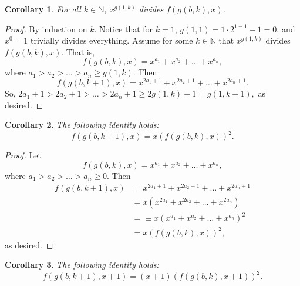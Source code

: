 \documentclass{article}
\newtheorem{corollary}{Corollary}
\newcommand{\N}{\mathbb{N}}
\begin{document}
	\begin{corollary}
		For all $k \in \N$, $x^{g(1,k)}$ divides $f(g(b,k),x)$.
	\end{corollary}
	\begin{proof}
		By induction on $k$.
		Notice that for $k=1$, $g(1,1) = 1\cdot2^{1-1} - 1 = 0$, and $x^0 = 1$ trivially divides everything.
		Assume for some $k \in \N$ that $x^{g(1,k)}$ divides $f(g(b,k),x)$.
		That is,
		\begin{equation*}
			f(g(b,k),x) = x^{a_1} + x^{a_2} + \dots + x^{a_n},
		\end{equation*}
		where $a_1 > a_2 > \dots > a_n \geq g(1,k)$.
		Then
		\begin{equation*}
			f(g(b,k+1),x) = x^{2a_1 + 1} + x^{2a_2 + 1} + \dots + x^{2a_n + 1}.
		\end{equation*} 
		So, $2a_1 + 1 > 2a_2 + 1 > \dots > 2a_n + 1 \geq 2g(1,k)+1 = g(1,k+1),$ as desired.
	\end{proof}
	
	\begin{corollary}\label{fx-iterative-col}
		The following identity holds:
		\begin{equation*}
			f(g(b,k+1),x) = x\left(f(g(b,k),x)\right)^2.
		\end{equation*}
	\end{corollary}
	\begin{proof}
		Let
		\begin{equation*}
			f(g(b,k),x) = x^{a_1} + x^{a_2} + \dots + x^{a_n},
		\end{equation*}
		where $a_1 > a_2 > \dots > a_n \geq 0$.
		Then
		\begin{align*}
			f(g(b,k+1),x) &= x^{2a_1 + 1} + x^{2a_2 + 1} + \dots + x^{2a_n+1} \\
			&= x\left(x^{2a_1} + x^{2a_2} + \dots + x^{2a_n}\right) \\
			&=\equiv x\left(x^{a_1} + x^{a_2} + \dots + x^{a_n}\right)^2 \\
			&= x\left(f(g(b,k),x)\right)^2,
		\end{align*}
		as desired.
	\end{proof}
	
	\begin{corollary}\label{fx1-iterative-col}
		The following identity holds:
		\begin{equation*}
			f(g(b,k+1),x+1) = (x+1)\left(f(g(b,k),x+1)\right)^2.
		\end{equation*}
	\end{corollary}
	
\end{document}
